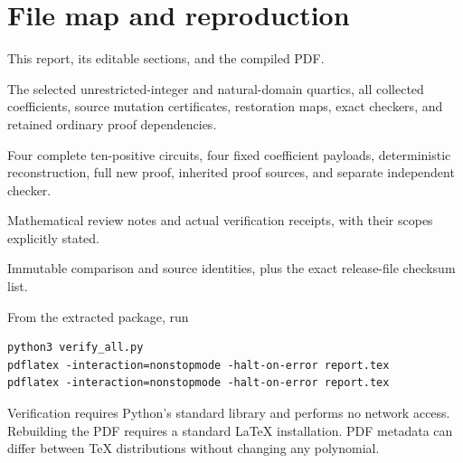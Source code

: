 \documentclass[11pt]{article}
\newcommand{\code}[1]{\nolinkurl{#1}}
\theoremstyle{remark}
\numberwithin{equation}{section}
\begin{document}
\section{File map and reproduction}
\begin{description}[style=nextline]
\item[\code{report.tex}, \code{report_inputs/}, \code{report.pdf}]
This report, its editable sections, and the compiled PDF.
\item[\code{arithmetic/}]
The selected unrestricted-integer and natural-domain quartics, all collected coefficients, source mutation certificates, restoration maps, exact checkers, and retained ordinary proof dependencies.
\item[\code{compact/}]
Four complete ten-positive circuits, four fixed coefficient payloads, deterministic reconstruction, full new proof, inherited proof sources, and separate independent checker.
\item[\code{reviews/}, \code{verification/}]
Mathematical review notes and actual verification receipts, with their scopes explicitly stated.
\item[\code{PROVENANCE.json}, \code{MANIFEST.sha256}]
Immutable comparison and source identities, plus the exact release-file checksum list.
\end{description}
From the extracted package, run
\begin{lstlisting}
python3 verify_all.py
pdflatex -interaction=nonstopmode -halt-on-error report.tex
pdflatex -interaction=nonstopmode -halt-on-error report.tex
\end{lstlisting}
Verification requires Python's standard library and performs no network access. Rebuilding the PDF requires a standard LaTeX installation. PDF metadata can differ between TeX distributions without changing any polynomial.
\end{document}
